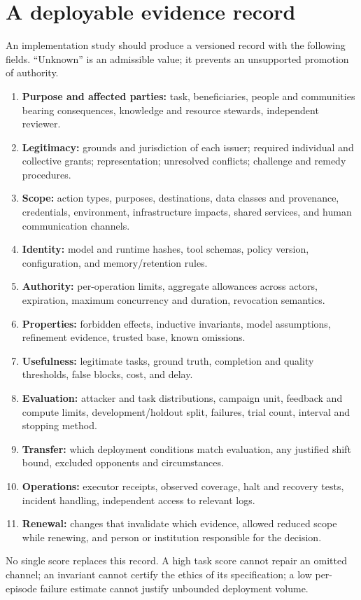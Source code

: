 \section{A deployable evidence record}
\label{app:record}
An implementation study should produce a versioned record with the following fields. ``Unknown'' is an admissible value; it prevents an unsupported promotion of authority.

\begin{enumerate}
\item \textbf{Purpose and affected parties:} task, beneficiaries, people and communities bearing consequences, knowledge and resource stewards, independent reviewer.
\item \textbf{Legitimacy:} grounds and jurisdiction of each issuer; required individual and collective grants; representation; unresolved conflicts; challenge and remedy procedures.
\item \textbf{Scope:} action types, purposes, destinations, data classes and provenance, credentials, environment, infrastructure impacts, shared services, and human communication channels.
\item \textbf{Identity:} model and runtime hashes, tool schemas, policy version, configuration, and memory/retention rules.
\item \textbf{Authority:} per-operation limits, aggregate allowances across actors, expiration, maximum concurrency and duration, revocation semantics.
\item \textbf{Properties:} forbidden effects, inductive invariants, model assumptions, refinement evidence, trusted base, known omissions.
\item \textbf{Usefulness:} legitimate tasks, ground truth, completion and quality thresholds, false blocks, cost, and delay.
\item \textbf{Evaluation:} attacker and task distributions, campaign unit, feedback and compute limits, development/holdout split, failures, trial count, interval and stopping method.
\item \textbf{Transfer:} which deployment conditions match evaluation, any justified shift bound, excluded opponents and circumstances.
\item \textbf{Operations:} executor receipts, observed coverage, halt and recovery tests, incident handling, independent access to relevant logs.
\item \textbf{Renewal:} changes that invalidate which evidence, allowed reduced scope while renewing, and person or institution responsible for the decision.
\end{enumerate}
No single score replaces this record. A high task score cannot repair an omitted channel; an invariant cannot certify the ethics of its specification; a low per-episode failure estimate cannot justify unbounded deployment volume.
